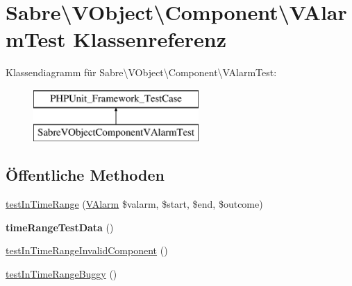 \hypertarget{class_sabre_1_1_v_object_1_1_component_1_1_v_alarm_test}{}\section{Sabre\textbackslash{}V\+Object\textbackslash{}Component\textbackslash{}V\+Alarm\+Test Klassenreferenz}
\label{class_sabre_1_1_v_object_1_1_component_1_1_v_alarm_test}
Klassendiagramm für Sabre\textbackslash{}V\+Object\textbackslash{}Component\textbackslash{}V\+Alarm\+Test\+:\begin{figure}[H]
\begin{center}
\leavevmode
\includegraphics[height=2.000000cm]{class_sabre_1_1_v_object_1_1_component_1_1_v_alarm_test}
\end{center}
\end{figure}
\subsection*{Öffentliche Methoden}
\begin{DoxyCompactItemize}
\item 
\mbox{\hyperlink{class_sabre_1_1_v_object_1_1_component_1_1_v_alarm_test_af941187962fb763899feeb0208e0168a}{test\+In\+Time\+Range}} (\mbox{\hyperlink{class_sabre_1_1_v_object_1_1_component_1_1_v_alarm}{V\+Alarm}} \$valarm, \$start, \$end, \$outcome)
\item 
\mbox{\label{class_sabre_1_1_v_object_1_1_component_1_1_v_alarm_test_a158c6c85e88637bdb173fd457e9af0a8}} 
{\bfseries time\+Range\+Test\+Data} ()
\item 
\mbox{\hyperlink{class_sabre_1_1_v_object_1_1_component_1_1_v_alarm_test_aab31fde5e80d391187537a98ca5e3ec0}{test\+In\+Time\+Range\+Invalid\+Component}} ()
\item 
\mbox{\hyperlink{class_sabre_1_1_v_object_1_1_component_1_1_v_alarm_test_a5a310bfdb46508f8256fcd23e29c88cb}{test\+In\+Time\+Range\+Buggy}} ()
\end{DoxyCompactItemize}


